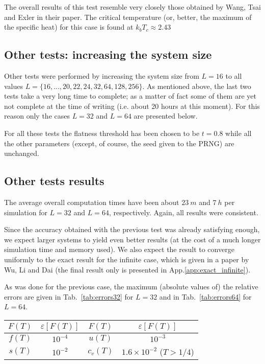 \documentclass[11pt]{article}
\newcommand{\tabname}{Tab.~}
\newcommand{\appname}{App.}
\begin{document}
The overall results of this test resemble very closely those obtained by Wang, Tsai and Exler in their paper. The critical temperature (or, better, the maximum of the specific heat) for this case is found at $k_bT_c \approx 2.43$

\subsection{Other tests: increasing the system size}

Other tests were performed by increasing the system size from $L=16$ to all values $L=\{16,...,20,22,24,32,64,128,256\}$. As mentioned above, the last two tests take a very long time to complete; as a matter of fact some of them are yet not complete at the time of writing (i.e. about 20 hours at this moment). For this reason only the cases $L=32$ and $L=64$ are presented below.

For all these tests the flatness threshold has been chosen to be $t=0.8$ while all the other parameters (except, of course, the seed given to the PRNG) are unchanged.


\subsection{Other tests results}

The average overall computation times have been about $23~m$ and $7~h$  per simulation for $L=32$ and $L=64$, respectively. Again, all results were consistent.

Since the accuracy obtained with the previous test was already satisfying enough, we expect larger systems to yield even better results (at the cost of a much longer simulation time and memory used). We also expect the result to converge uniformly to the exact result for the infinite case, which is given in a paper by Wu, Li and Dai\cite{bib:exact2} (the final result only is presented in \appname \ref{app:exact_infinite}).

As was done for the previous case, the maximum (absolute values of) the relative errors are given in \tabname \ref{tab:errors32} for $L=32$ and in \tabname \ref{tab:errors64} for $L=64$.

\begin{center}
\label{tab:errors32}
\begin{tabular}{cccc}
\toprule
$F(T)$	&	$\varepsilon[F(T)]$	&	$F(T)$		&	$\varepsilon[F(T)]$					\\
\midrule
$f(T)$	&	$10^{-4}$			&	$u(T)$		&	$10^{-3}$							\\
$s(T)$	&	$10^{-2}$			&	$c_v(T)$	&	$1.6 \times 10^{-2}$ ($T > 1/4$)	\\
\bottomrule
\end{tabular}
\end{center}
\end{document}
